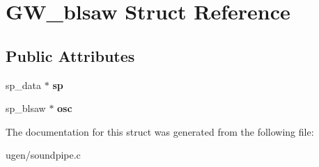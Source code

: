 \hypertarget{structGW__blsaw}{}\section{G\+W\+\_\+blsaw Struct Reference}
\label{structGW__blsaw}
\subsection*{Public Attributes}
\begin{DoxyCompactItemize}
\item 
\hypertarget{structGW__blsaw_aafcdae925e5bc018d42c06f08d02dc52}{}\label{structGW__blsaw_aafcdae925e5bc018d42c06f08d02dc52} 
sp\+\_\+data $\ast$ {\bfseries sp}
\item 
\hypertarget{structGW__blsaw_aac703a0a57feb26884a84a56cf148939}{}\label{structGW__blsaw_aac703a0a57feb26884a84a56cf148939} 
sp\+\_\+blsaw $\ast$ {\bfseries osc}
\end{DoxyCompactItemize}


The documentation for this struct was generated from the following file\+:\begin{DoxyCompactItemize}
\item 
ugen/soundpipe.\+c\end{DoxyCompactItemize}
